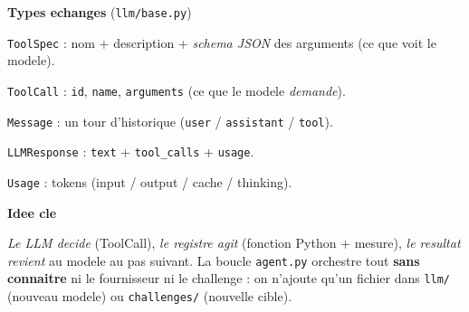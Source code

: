\documentclass{article}
\begin{document}
\begin{minipage}[t]{0.36\linewidth}
\textbf{\large Types echanges} (\texttt{llm/base.py})
\begin{description}[leftmargin=0em,itemsep=1pt,topsep=3pt]
  \item \texttt{ToolSpec} : nom + description + \emph{schema JSON} des arguments (ce que voit le modele).
  \item \texttt{ToolCall} : \texttt{id}, \texttt{name}, \texttt{arguments} (ce que le modele \emph{demande}).
  \item \texttt{Message} : un tour d'historique (\texttt{user} / \texttt{assistant} / \texttt{tool}).
  \item \texttt{LLMResponse} : \texttt{text} + \texttt{tool\_calls} + \texttt{usage}.
  \item \texttt{Usage} : tokens (input / output / cache / thinking).
\end{description}

\vspace{0.25cm}
\textbf{\large Idee cle}
\begin{description}[leftmargin=0em,itemsep=1pt,topsep=3pt]
  \item \emph{Le LLM decide} (ToolCall), \emph{le registre agit} (fonction Python + mesure),
    \emph{le resultat revient} au modele au pas suivant. La boucle \texttt{agent.py} orchestre
    tout \textbf{sans connaitre} ni le fournisseur ni le challenge : on n'ajoute qu'un fichier
    dans \texttt{llm/} (nouveau modele) ou \texttt{challenges/} (nouvelle cible).
\end{description}
\end{minipage}
\end{document}
